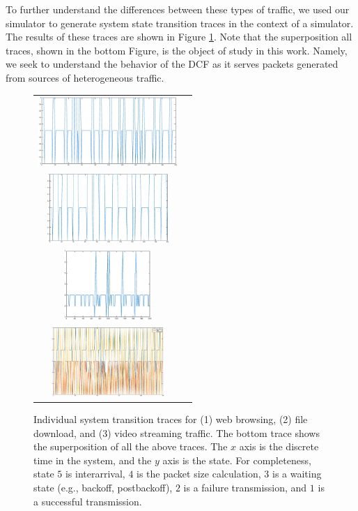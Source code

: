 \documentclass{llncs}
\begin{document}
To further understand the differences between these types of traffic, we used our simulator to generate system state transition traces in the context of a simulator. The results of these traces are shown in Figure \ref{fig:traces}. Note that the superposition all traces, shown in the bottom Figure, is the object of study in this work. Namely, we seek to understand the behavior of the DCF as it serves packets generated from sources of heterogeneous traffic.

\begin{figure}
\begin{tabular}{cc}
\includegraphics[width=\textwidth,height=100px]{../../src/results/browse_time.eps} \\
\includegraphics[width=\textwidth,height=100px]{../../src/results/file_time.eps} \\
\includegraphics[width=\textwidth,height=100px]{../../src/results/video_time.eps} \\
\includegraphics[width=\textwidth,height=100px]{../../src/results/all.eps} \\
\end{tabular}
\caption{Individual system transition traces for (1) web browsing, (2) file download, and (3) video streaming traffic. The bottom trace shows the superposition of all the above traces. The $x$ axis is the discrete time in the system, and the $y$ axis is the state. For completeness, state $5$ is interarrival, $4$ is the packet size calculation, $3$ is a waiting state (e.g., backoff, postbackoff), $2$ is a failure transmission, and $1$ is a successful transmission.}
\label{fig:traces}
\end{figure}
\end{document}
